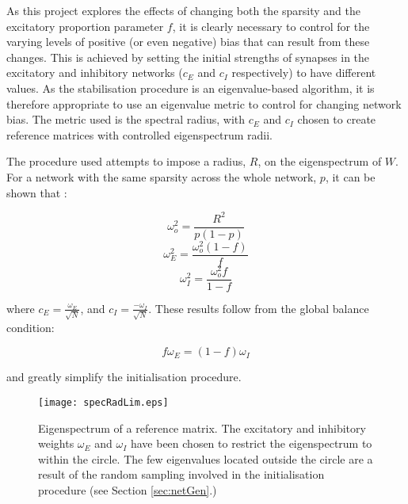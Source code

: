 \documentclass[12pt, a4paper]{article}
\begin{document}
As this project explores the effects of changing both the sparsity and the excitatory proportion parameter $f$, it is clearly necessary to control for the varying levels of positive (or even negative) bias that can result from these changes.  This is achieved by setting the initial strengths of synapses in the excitatory and inhibitory networks ($c_E$ and $c_I$ respectively) to have different values.  As the stabilisation procedure is an eigenvalue-based algorithm, it is therefore appropriate to use an eigenvalue metric to control for changing network bias.  The metric used is the spectral radius, with $c_E$ and $c_I$ chosen to create reference matrices with controlled eigenspectrum radii.

The procedure used attempts to impose a radius, $R$, on the eigenspectrum of $W$.  For a network with the same sparsity across the whole network, $p$, it can be shown that \cite{Rajan2006}:

    \begin{equation}    \omega_o^2 = \frac{R^2}{p(1-p)}                 \end{equation}
    \begin{equation}    \omega_E^2 = \frac{\omega_o^2(1-f)}{f}          \end{equation}
    \begin{equation}    \omega_I^2 = \frac{\omega_o^2 f}{1-f}           \end{equation}

\noindent where $c_E = \frac{\omega_E}{\sqrt{N}}$, and $c_I = \frac{- \omega_I}{\sqrt{N}}$.  These results follow from the global balance condition:

    \begin{equation}    f \omega_E = (1-f) \omega_I                     \end{equation}
    
\noindent and greatly simplify the initialisation procedure.  




\begin{SCfigure}
    \centering
    \texttt{[image: specRadLim.eps]}
    \caption{Eigenspectrum of a reference matrix.  The excitatory and inhibitory weights $\omega_E$ and $\omega_I$ have been chosen to restrict the eigenspectrum to within the circle.  The few eigenvalues located outside the circle are a result of the random sampling involved in the initialisation procedure (see Section \ref{sec:netGen}.)}
    \label{fig:limitRadius}
\end{SCfigure}
\end{document}
